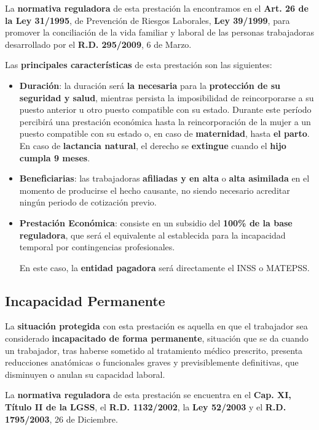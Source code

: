 La \textbf{normativa reguladora} de esta prestación la encontramos en el \textbf{Art. 26 de la Ley 31/1995}, de Prevención de Riesgos Laborales, \textbf{Ley 39/1999}, para promover la conciliación de la vida familiar y laboral de las personas trabajadoras desarrollado por el \textbf{R.D. 295/2009}, 6 de Marzo.

Las \textbf{principales características} de esta prestación son las siguientes:

\begin{itemize}
    \item \textbf{Duración}: la duración será \textbf{la necesaria} para la \textbf{protección de su seguridad y salud}, mientras persista la imposibilidad de reincorporarse a su puesto anterior u otro puesto compatible con su estado. Durante este período percibirá una prestación económica hasta la reincorporación de la mujer  a un puesto compatible con su estado o, en caso de \textbf{maternidad}, hasta \textbf{el parto}.  En caso de \textbf{lactancia natural}, el derecho se \textbf{extingue} cuando el \textbf{hijo cumpla 9 meses}.

    \item \textbf{Beneficiarias}: las trabajadoras \textbf{afiliadas y en alta} o \textbf{alta asimilada} en el momento de producirse el hecho causante, no siendo necesario acreditar ningún periodo de cotización previo.

    \item \textbf{Prestación Económica}: consiste en un subsidio del \textbf{100\% de la base reguladora}, que será el equivalente al establecida para la incapacidad temporal por contingencias profesionales.

    En este caso, la \textbf{entidad pagadora} será directamente el INSS o MATEPSS.
\end{itemize}

\subsection{Incapacidad Permanente}
La \textbf{situación protegida} con esta prestación es aquella en que el trabajador sea considerado \textbf{incapacitado de forma permanente}, situación que se da cuando un trabajador, tras haberse sometido al tratamiento médico prescrito, presenta reducciones anatómicas o funcionales graves y previsiblemente definitivas, que disminuyen o anulan su capacidad laboral.

La \textbf{normativa reguladora} de esta prestación se encuentra en el \textbf{Cap. XI, Título II de la LGSS}, el \textbf{R.D. 1132/2002}, la \textbf{Ley 52/2003} y el \textbf{R.D. 1795/2003}, 26 de Diciembre.


